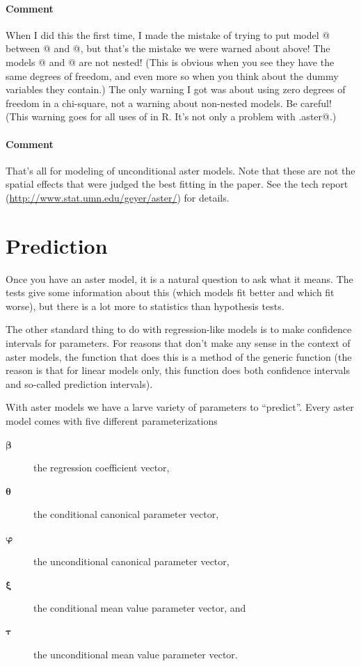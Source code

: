 \documentclass[11pt]{article}
\newcommand{\boldbeta}{{\boldsymbol{\beta}}}
\newcommand{\boldtheta}{{\boldsymbol{\theta}}}
\newcommand{\boldxi}{{\boldsymbol{\xi}}}
\newcommand{\boldtau}{{\boldsymbol{\tau}}}
\newcommand{\boldvarphi}{{\boldsymbol{\varphi}}}
\begin{document}
\paragraph{Comment}  When I did this the first time, I made the mistake
of trying to put model @ between @ and @,
but that's the mistake we were warned about above!  The models @
and @ are not nested!  (This is obvious when you see they have
the same degrees of freedom, and even more so when you think about the
dummy variables they contain.)  The only warning I got was about using
zero degrees of freedom in a chi-square, not a warning about non-nested
models.  Be careful!  (This warning goes for all uses of \verb@anova@ in
R.  It's not only a problem with \verb@anova.aster@.)

\paragraph{Comment}  That's all for modeling of unconditional aster models.
Note that these are not the spatial effects that were judged the best fitting
in the paper.  See the tech report (\url{http://www.stat.umn.edu/geyer/aster/})
for details.

\section{Prediction}

Once you have an aster model, it is a natural question to ask what it means.
The \verb@anova@ tests give some information about this (which models fit
better and which fit worse), but there is a lot more to statistics than
hypothesis tests.

The other standard thing to do with regression-like models is to make
confidence intervals for parameters.  For reasons that don't make any
sense in the context of aster models, the function that does this is
a method of the \verb@predict@ generic function (the reason is that for
linear models only, this function does both confidence intervals and
so-called prediction intervals).

With aster models we have a larve variety of parameters to ``predict''.
Every aster model comes with five different parameterizations
\begin{description}
\item[$\boldbeta$] the regression coefficient vector,
\item[$\boldtheta$] the conditional canonical parameter vector,
\item[$\boldvarphi$] the unconditional canonical parameter vector,
\item[$\boldxi$] the conditional mean value parameter vector, and
\item[$\boldtau$] the unconditional mean value parameter vector.
\end{description}
\end{document}
